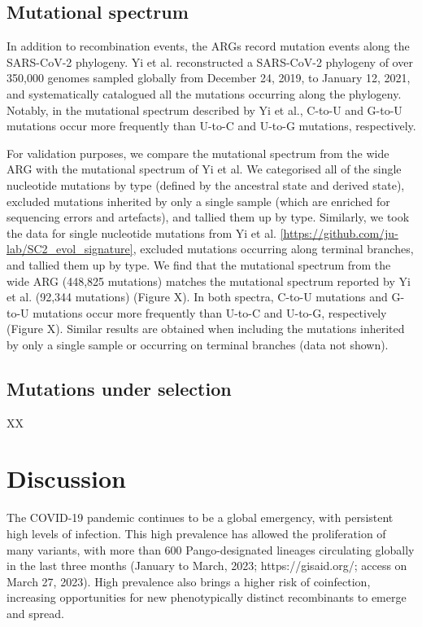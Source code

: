 \documentclass{article}
\begin{document}
\subsection{Mutational spectrum}

In addition to recombination events, the ARGs record mutation events along the
SARS-CoV-2 phylogeny. Yi et al. \cite{Yi2021-sc} reconstructed a SARS-CoV-2
phylogeny of over 350,000 genomes sampled globally from December 24, 2019, to
January 12, 2021, and systematically catalogued all the mutations occurring
along the phylogeny. Notably, in the mutational spectrum described by Yi et
al., C-to-U and G-to-U mutations occur more frequently than U-to-C and U-to-G
mutations, respectively.

For validation purposes, we compare the mutational spectrum from the wide ARG
with the mutational spectrum of Yi et al. We categorised all of the single
nucleotide mutations by type (defined by the ancestral state and derived
state), excluded mutations inherited by only a single sample (which are
enriched for sequencing errors and artefacts), and tallied them up by type.
Similarly, we took the data for single nucleotide mutations from Yi et al.
\ref{https://github.com/ju-lab/SC2_evol_signature}, excluded mutations
occurring along terminal branches, and tallied them up by type. We find that
the mutational spectrum from the wide ARG (448,825 mutations) matches the
mutational spectrum reported by Yi et al. (92,344 mutations) (Figure X). In
both spectra, C-to-U mutations and G-to-U mutations occur more frequently than
U-to-C and U-to-G, respectively (Figure X). Similar results are obtained when
including the mutations inherited by only a single sample or occurring on
terminal branches (data not shown).

\subsection{Mutations under selection}

XX

\section{Discussion}

The COVID-19 pandemic continues to be a global emergency, with persistent high
levels of infection. This high prevalence has allowed the proliferation of many
variants, with more than 600 Pango-designated lineages circulating globally in
the last three months (January to March, 2023; https://gisaid.org/; access on
March 27, 2023). High prevalence also brings a higher risk of coinfection,
increasing opportunities for new phenotypically distinct recombinants to emerge
and spread.
\end{document}
